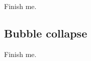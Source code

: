   Finish me.

\subsection{Bubble collapse}\label{sec:bubbleCollapse}

  Finish me.

\clearpage



\clearpage



\clearpage


\clearpage


